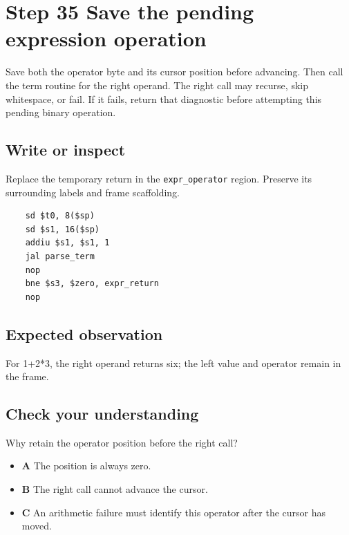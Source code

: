 \section{Step 35 Save the pending expression operation}\label{expression-s35}

Save both the operator byte and its cursor position before advancing. Then call the term routine for the right operand. The right call may recurse, skip whitespace, or fail. If it fails, return that diagnostic before attempting this pending binary operation.

\subsection{Write or inspect}
Replace the temporary return in the \texttt{expr\_operator} region. Preserve its surrounding labels and frame scaffolding.

\begin{verbatim}
    sd $t0, 8($sp)
    sd $s1, 16($sp)
    addiu $s1, $s1, 1
    jal parse_term
    nop
    bne $s3, $zero, expr_return
    nop
\end{verbatim}
\subsection{Expected observation}
For 1+2*3, the right operand returns six; the left value and operator remain in the frame.

\subsection{Check your understanding}
Why retain the operator position before the right call?

\begin{itemize}
  \item \textbf{A} The position is always zero.
  \item \textbf{B} The right call cannot advance the cursor.
  \item \textbf{C} An arithmetic failure must identify this operator after the cursor has moved.
\end{itemize}
